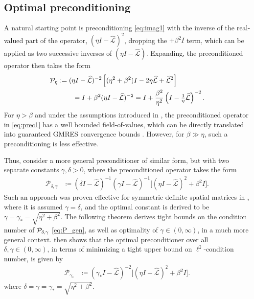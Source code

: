 \documentclass[a4paper,10pt]{article}
\begin{document}
\subsection{Optimal preconditioning}\label{sec:solve:gamma}

A natural starting point is preconditioning \eqref{eq:imag1} with the inverse of
the real-valued part of the operator, $(\eta I - \widehat{\mathcal{L}})^2$,
dropping the $+ \beta^2 I$ term, which can be applied as two successive inverses
of $(\eta I - \widehat{\mathcal{L}})$. Expanding, the preconditioned operator
then takes the form
%
\begin{align}\nonumber
\mathcal{P}_\eta & := (\eta I - \widehat{\mathcal{L}})^{-2}
	\left[(\eta^2+\beta^2)I - 2\eta \widehat{\mathcal{L}} + \widehat{\mathcal{L}}^2\right]  \\
&\hspace{5ex} = I + \beta^2(\eta I - \widehat{\mathcal{L}})^{-2}
= I + \frac{\beta^2}{\eta^2}\left(I - \tfrac{1}{\eta}\widehat{\mathcal{L}}\right)^{-2}.\label{eq:prec1}
\end{align}
%
For $\eta > \beta$ and under the assumptions introduced in ,
the preconditioned operator in \eqref{eq:prec1} has a well bounded field-of-values,
which can be directly translated into guaranteed GMRES convergence bounds
\cite{liesen2012field}. However, for $\beta \gg \eta$, such a preconditioning
is less effective. 

Thus, consider a more general preconditioner of similar form, but with two separate
constants $\gamma,\delta > 0$, where the preconditioned operator takes the form
%
\begin{align}\label{eq:P_gen}
\mathcal{P}_{\delta,\gamma} & \coloneqq
	(\delta I - \widehat{\mathcal{L}})^{-1}(\gamma I - \widehat{\mathcal{L}})^{-1}
		\Big[(\eta I - \widehat{\mathcal{L}})^2 + \beta^2 I\Big].
\end{align}
%
Such an approach was proven effective for symmetric definite spatial matrices in
\cite{exh}, where it is assumed $\gamma = \delta$, and the optimal constant is
derived to be $\gamma = \gamma_* = \sqrt{\eta^2+\beta^2}$. The following
theorem derives tight bounds on the condition number of ${\cal P}_{\delta,\gamma}$ 
\eqref{eq:P_gen}, as well as optimality of $\gamma\in(0,\infty)$, in a much
more general context.   then shows that the optimal preconditioner 
over all $\delta,\gamma\in(0,\infty)$, in terms of minimizing a tight upper bound
on $\ell^2$-condition number, is given by 
%
\begin{align}\label{eq:P_gamma}
\mathcal{P}_{\gamma_*} & \coloneqq
	(\gamma_* I - \widehat{\mathcal{L}})^{-2}
		\Big[(\eta I - \widehat{\mathcal{L}})^2 + \beta^2 I\Big].
\end{align}
%
where $\delta = \gamma = \gamma_* = \sqrt{\eta^2+\beta^2}$.
\end{document}
